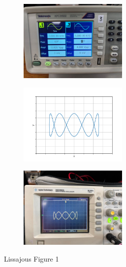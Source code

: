 \documentclass[a4paper,12pt]{article}
\begin{document}
\begin{figure}[h!]
	\begin{subfigure}[b]{10pt}
		\includegraphics[width = 150pt]{figs/fig1.jpeg}
	\end{subfigure}
	\hspace{120pt}
	\begin{subfigure}[b]{10pt}
		\includegraphics[width = 150pt]{figs/fig1.png}
	\end{subfigure}
	\hspace{130pt}
	\begin{subfigure}[b]{10pt}
		\includegraphics[width = 150pt]{figs/fig1_1.jpeg}
	\end{subfigure}
	\caption{Lissajous Figure 1}
\end{figure}
\end{document}
